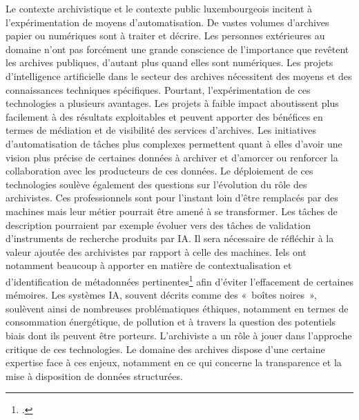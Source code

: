 Le contexte archivistique et le contexte public luxembourgeois incitent à l'expérimentation de moyens d'automatisation. De vastes volumes d'archives papier ou numériques sont à traiter et décrire. 
Les personnes extérieures au domaine n'ont pas forcément une grande conscience de l'importance que revêtent les archives publiques, d'autant plus quand elles sont numériques.
Les projets d'intelligence artificielle dans le secteur des archives nécessitent des moyens et des connaissances techniques spécifiques. 
Pourtant, l'expérimentation de ces technologies a plusieurs avantages. 
Les projets à faible impact aboutissent plus facilement à des résultats exploitables et peuvent apporter des bénéfices en termes de médiation et de visibilité des services d'archives. 
Les initiatives d'automatisation de tâches plus complexes permettent quant à elles d'avoir une vision plus précise de certaines données à archiver et d'amorcer ou renforcer la collaboration avec les producteurs de ces données.
Le déploiement de ces technologies soulève également des questions sur l'évolution du rôle des archivistes. Ces professionnels sont pour l'instant loin d'être remplacés par des machines mais leur métier pourrait être amené à se transformer. 
Les tâches de description pourraient par exemple évoluer vers des tâches de validation d'instruments de recherche produits par IA. 
Il sera nécessaire de réfléchir à la valeur ajoutée des archivistes par rapport à celle des machines. Iels ont notamment beaucoup à apporter en matière de contextualisation et d'identification de métadonnées pertinentes\footcite{IA_INA} afin d'éviter l'effacement de certaines mémoires. Les systèmes IA, souvent décrits comme des «~boîtes noires~», soulèvent ainsi de nombreuses problématiques éthiques, notamment en termes de consommation énergétique, de pollution et à travers la question des potentiels biais dont ils peuvent être porteurs. L’archiviste a un rôle à jouer dans l’approche critique de ces technologies. Le domaine des archives dispose d’une certaine expertise face à ces enjeux, notamment en ce qui concerne la transparence et la mise à disposition de données structurées.

